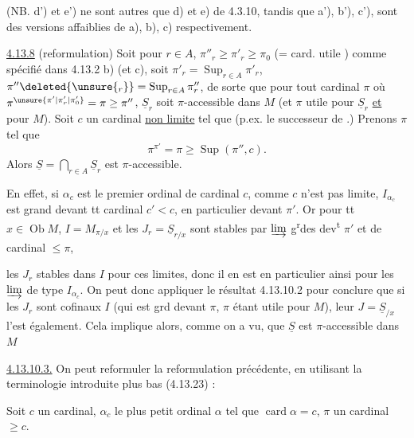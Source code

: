 (NB. d') et e') ne sont autres que d) et e)
de 4.3.10, tandis que a'), b'), c'), sont
des versions affaiblies de a), b), c)
respectivement.

\uline{4.13.8} (reformulation) Soit pour $r\in A$, $\pi''_r\geq\pi'_r\geq\pi_0$ (= card. utile  )
comme spécifié dans 4.13.2 b) (et c),  soit $\pi'_r=\operatorname{Sup}_{r\in A}\pi'_r$, $\pi''\deleted{\unsure{{}_r}}=\operatorname{Sup}_{r\in A}\pi''_r$, de
sorte que pour tout cardinal $\pi$ où $\pi^{\unsure{\pi'|\pi'_r|\pi'_0}}=\pi\geq\pi''$, $\underline S_r$ soit $\pi$-accessible
dans $M$ (et $\pi$ utile pour $\underline S_r$ \uline{et} pour $M$). Soit $c$ un cardinal \uline{non
limite} tel que 
(p.ex.  le successeur de .) Prenons $\pi$ tel
que
\[
\pi^{\pi'}=\pi\geq\operatorname{Sup}(\pi'',c).
\]
Alors $\underline S=\bigcap_{r\in A}\underline S_r$ est $\pi$-accessible.

En effet, si $\alpha_c$ est le premier ordinal de cardinal $c$, comme $c$ n'est
pas limite, $I_{\alpha_c}$ est grand devant tt cardinal $c'<c$, en particulier
devant $\pi'$.  Or  pour tt $x\in\operatorname{Ob}M$, $I=M_{\pi/x}$ et les $J_r=\underline S_{r/x}$
sont stables par $\varinjlim$ g\textsuperscript{r}des dev\textsuperscript{t} $\pi'$ et de cardinal $\leq\pi$, 

  les $J_r$ stables dans $I$ pour ces limites,
donc il en est en particulier ainsi pour les $\varinjlim$
de type $I_{\alpha_c}$. On peut donc appliquer le résultat
4.13.10.2 pour conclure que si les $J_r$ sont
cofinaux  $I$ (qui est grd devant $\pi$, $\pi$ étant utile
pour $M$), leur $J=\underline S_{/x}$ l'est également. Cela implique
alors, comme on a vu, que $\underline S$ est $\pi$-accessible
dans $M$

\uline{4.13.10.3.} On peut reformuler la reformulation
précédente, en utilisant la terminologie introduite
plus bas (4.13.23) :

Soit $c$ un cardinal,  $\alpha_c$ le plus petit
ordinal $\alpha$ tel que $\operatorname{card}\alpha=c$, $\pi$ un cardinal $\geq c$.


